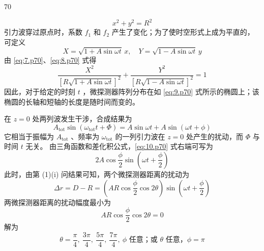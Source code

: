\begin{solution}{70}
\begin{subsolution}
\begin{subsubsolution}
            \begin{equation}
                x^{2} + y^{2} = R^{2} \label{eq:7.p70}
            \end{equation}
            引力波穿过原点时，系数 $f_{1}$ 和 $f_{2}$ 产生了变化；为了使时空形式上成为平直的，可定义
            \begin{equation}
                X = \sqrt{1 + A\sin\omega t}\,x,\quad Y = \sqrt{1 - A\sin\omega t}\,y \label{eq:8.p70}
            \end{equation}
            由 \eqref{eq:7.p70}、\eqref{eq:8.p70} 式得
            \begin{equation}
                \frac{X^{2}}{\left[R\sqrt{1 + A\sin\omega t}\right]^{2}} + \frac{Y^{2}}{\left[R\sqrt{1 - A\sin\omega t}\right]^{2}} = 1 \label{eq:9.p70}
            \end{equation}
            因此，对于给定的时刻 $t$ ，微探测器阵列分布在如 \eqref{eq:9.p70} 式所示的椭圆上；该椭圆的长轴和短轴的长度是随时间而变的。
        \end{subsubsolution}
        \begin{subsubsolution}
            在 $z=0$ 处两列波发生干涉，合成结果为
            \begin{equation}
                A_{\mathrm{tot}}\sin(\omega_{\mathrm{tot}} t + \Phi) = A\sin\omega t + A\sin(\omega t + \phi) \label{eq:10.p70}
            \end{equation}
            它相当于振幅为 $A_{\mathrm{tot}}$ 、频率为 $\omega_{\mathrm{tot}}$ 的一列引力波在 $z=0$ 处产生的扰动，而 $\Phi$ 与时间 $t$ 无关。
            由三角函数和差化积公式，\eqref{eq:10.p70} 式右端可写为
            \begin{equation}
                2A\cos\frac{\phi}{2}\sin(\omega t + \frac{\phi}{2}) \label{eq:11.p70}
            \end{equation}
            此时，由第 (1)(i) 问结果可知，两个微探测器距离的扰动为
            \begin{equation}
                \Delta r = D - R = \left( A R \cos\frac{\phi}{2}\cos 2\theta \right) \sin(\omega t + \frac{\phi}{2}) \label{eq:12.p70}
            \end{equation}
            两微探测器距离的扰动幅度最小为
            \begin{equation*}
                A R \cos\frac{\phi}{2}\cos 2\theta = 0
            \end{equation*}
            解为
            \begin{equation}
                \theta = \frac{\pi}{4},\ \frac{3\pi}{4},\ \frac{5\pi}{4},\ \frac{7\pi}{4},\ \phi \text{ 任意；或 } \theta \text{ 任意，} \phi = \pi \label{eq:13.p70}

\end{equation}
\end{subsubsolution}
\end{subsolution}
\end{solution}
